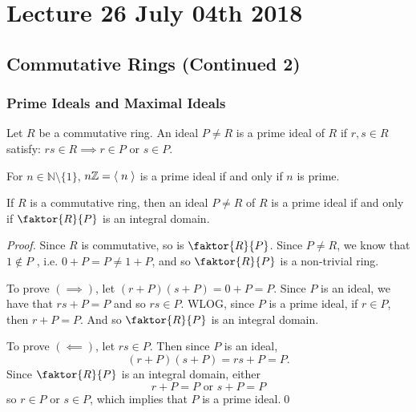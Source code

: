\chapter{Lecture 26 July 04th 2018}%
\label{chp:lecture_26_july_04th_2018}

\section{Commutative Rings (Continued 2)}%
\label{sec:commutative_rings_continued_2}

\subsection{Prime Ideals and Maximal Ideals}%
\label{sub:prime_ideals_and_maximal_ideals}

\begin{defn}
\label{defn:prime_ideals}
  Let $R$ be a commutative ring. An ideal $P \neq R$ is a prime ideal of $R$ if $r, s \in R$ satisfy: $rs \in R \implies r \in P$ or $s \in P$.
\end{defn}

\begin{eg}
  For $n \in \mathbb{N} \setminus \{1\}$, $n \mathbb{Z} = \langle \; n \; \rangle$ is a prime ideal if and only if $n$ is prime.
\end{eg}

\begin{propo}
\label{propo:ideal_is_prime_iff_quotient_of_ring_by_ideal_is_an_integral_domain}
If $R$ is a commutative ring, then an ideal $P \neq R$ of $R$ is a prime ideal if and only if $\faktor{R}{P}$ is an integral domain.
\end{propo}

\begin{proof}
  Since $R$ is commutative, so is $\faktor{R}{P}$. Since $P \neq R$, we know that $1 \notin P$ , i.e. $0 + P = P \neq 1 + P$, and so $\faktor{R}{P}$ is a non-trivial ring.

  \noindent To prove $(\implies)$, let $(r + P)(s + P) = 0 + P = P$. Since $P$ is an ideal, we have that $rs + P = P$ and so $rs \in P$. WLOG, since $P$ is a prime ideal, if $r \in P$, then $r + P = P$. And so $\faktor{R}{P}$ is an integral domain.

  \noindent To prove $(\impliedby)$, let $rs \in P$. Then since $P$ is an ideal,
  \begin{equation*}
    (r + P)(s + P) = rs + P = P.
  \end{equation*}
  Since $\faktor{R}{P}$ is an integral domain, either
  \begin{equation*}
    r + P = P \text{ or } s + P = P
  \end{equation*}
  so $r \in P$ or $s \in P$, which implies that $P$ is a prime ideal.\qed
\end{proof}

